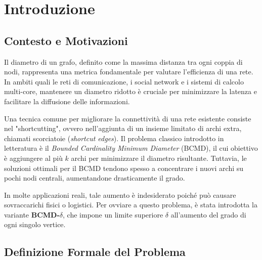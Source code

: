 \chapter{Introduzione}

\section{Contesto e Motivazioni}

Il diametro di un grafo, definito come la massima distanza tra ogni coppia di nodi, 
rappresenta una metrica fondamentale per valutare l'efficienza di una rete.
In ambiti quali le reti di comunicazione, i social network e i sistemi di calcolo multi-core,
mantenere un diametro ridotto è cruciale per minimizzare la latenza e facilitare la diffusione delle informazioni.

Una tecnica comune per migliorare la connettività di una rete esistente consiste nel "shortcutting", 
ovvero nell'aggiunta di un insieme limitato di archi extra, chiamati scorciatoie (\textit{shortcut edges}). 
Il problema classico introdotto in letteratura è il \textit{Bounded Cardinality Minimum Diameter} (BCMD),
il cui obiettivo è aggiungere al più $k$ archi per minimizzare il diametro risultante. 
Tuttavia, le soluzioni ottimali per il BCMD tendono spesso a concentrare i nuovi archi su pochi nodi centrali,
aumentandone drasticamente il grado. 

In molte applicazioni reali, tale aumento è indesiderato poiché può causare sovraccarichi fisici o logistici.
Per ovviare a questo problema, è stata introdotta la variante \textbf{BCMD-$\delta$}, 
che impone un limite superiore $\delta$ all'aumento del grado di ogni singolo vertice.



\section{Definizione Formale del Problema}


